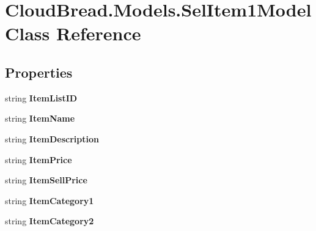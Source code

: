\hypertarget{a00091}{}\section{Cloud\+Bread.\+Models.\+Sel\+Item1\+Model Class Reference}
\label{a00091}
\subsection*{Properties}
\begin{DoxyCompactItemize}
\item 
string {\bfseries Item\+List\+ID}\hypertarget{a00091_a5b9ac7c75055e38add7563beff7088c4}{}\label{a00091_a5b9ac7c75055e38add7563beff7088c4}

\item 
string {\bfseries Item\+Name}\hypertarget{a00091_aefa03385eeb2061d5bd0b4ace9525972}{}\label{a00091_aefa03385eeb2061d5bd0b4ace9525972}

\item 
string {\bfseries Item\+Description}\hypertarget{a00091_ac59acb2682eaca0eabd251cef1351320}{}\label{a00091_ac59acb2682eaca0eabd251cef1351320}

\item 
string {\bfseries Item\+Price}\hypertarget{a00091_a5afe4def8a0c47310aa5fe93b0ba43a7}{}\label{a00091_a5afe4def8a0c47310aa5fe93b0ba43a7}

\item 
string {\bfseries Item\+Sell\+Price}\hypertarget{a00091_a37f36074466e812ad1fe11b8f5783c77}{}\label{a00091_a37f36074466e812ad1fe11b8f5783c77}

\item 
string {\bfseries Item\+Category1}\hypertarget{a00091_afcad7716dd3961b23462e701081189cf}{}\label{a00091_afcad7716dd3961b23462e701081189cf}

\item 
string {\bfseries Item\+Category2}\hypertarget{a00091_a33cd4468986950f423b74afedb2d9b46}{}\label{a00091_a33cd4468986950f423b74afedb2d9b46}


\end{DoxyCompactItemize}

